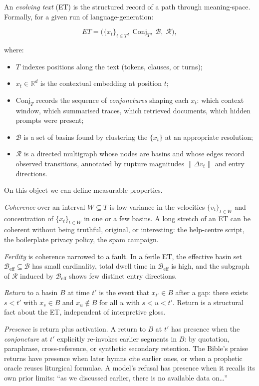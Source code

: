 \documentclass[12pt,a4paper]{article}
\begin{document}
An \emph{evolving text} (ET) is the structured record of a path through meaning-space. Formally, for a given run of language-generation:

\[
ET = \big(\{x_t\}_{t \in T},\; \mathrm{Conj}_T,\; \mathcal{B},\; \mathcal{R}\big),
\]

where:

\begin{itemize}
\item $T$ indexes positions along the text (tokens, clauses, or turns);
\item $x_t \in \mathbb{R}^d$ is the contextual embedding at position $t$;
\item $\mathrm{Conj}_T$ records the sequence of \emph{conjonctures} shaping each $x_t$: which context window, which summarised traces, which retrieved documents, which hidden prompts were present;
\item $\mathcal{B}$ is a set of basins found by clustering the $\{x_t\}$ at an appropriate resolution;
\item $\mathcal{R}$ is a directed multigraph whose nodes are basins and whose edges record observed transitions, annotated by rupture magnitudes $\|\Delta v_t\|$ and entry directions.
\end{itemize}

On this object we can define measurable properties.

\emph{Coherence} over an interval $W \subseteq T$ is low variance in the velocities $\{v_t\}_{t \in W}$ and concentration of $\{x_t\}_{t \in W}$ in one or a few basins. A long stretch of an ET can be coherent without being truthful, original, or interesting: the help-centre script, the boilerplate privacy policy, the spam campaign.

\emph{Ferility} is coherence narrowed to a fault. In a ferile ET, the effective basin set $\mathcal{B}_{\mathrm{eff}} \subseteq \mathcal{B}$ has small cardinality, total dwell time in $\mathcal{B}_{\mathrm{eff}}$ is high, and the subgraph of $\mathcal{R}$ induced by $\mathcal{B}_{\mathrm{eff}}$ shows few distinct entry directions.

\emph{Return} to a basin $B$ at time $t'$ is the event that $x_{t'} \in B$ after a gap: there exists $s < t'$ with $x_s \in B$ and $x_u \notin B$ for all $u$ with $s < u < t'$. Return is a structural fact about the ET, independent of interpretive gloss.

\emph{Presence} is return plus activation. A return to $B$ at $t'$ has presence when the \emph{conjoncture} at $t'$ explicitly re-invokes earlier segments in $B$: by quotation, paraphrase, cross-reference, or synthetic secondary retention. The Bible's praise returns have presence when later hymns cite earlier ones, or when a prophetic oracle reuses liturgical formulae. A model's refusal has presence when it recalls its own prior limits: ``as we discussed earlier, there is no available data on\ldots''
\end{document}
